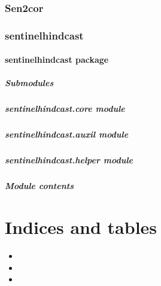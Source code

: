 \documentclass[letterpaper,10pt,english]{sphinxmanual}
\begin{document}
\subsection{Sen2cor}
\label{\detokenize{sen2cor:sen2cor}}\label{\detokenize{sen2cor::doc}}

\subsection{sentinel\sphinxhyphen{}hindcast}
\label{\detokenize{modules:sentinel-hindcast}}\label{\detokenize{modules::doc}}

\subsubsection{sentinelhindcast package}
\label{\detokenize{sentinelhindcast:sentinelhindcast-package}}\label{\detokenize{sentinelhindcast::doc}}

\paragraph{Submodules}
\label{\detokenize{sentinelhindcast:submodules}}

\paragraph{sentinelhindcast.core module}
\label{\detokenize{sentinelhindcast:sentinelhindcast-core-module}}

\paragraph{sentinelhindcast.auxil module}
\label{\detokenize{sentinelhindcast:sentinelhindcast-auxil-module}}

\paragraph{sentinelhindcast.helper module}
\label{\detokenize{sentinelhindcast:sentinelhindcast-helper-module}}

\paragraph{Module contents}
\label{\detokenize{sentinelhindcast:module-contents}}

\chapter{Indices and tables}
\label{\detokenize{index:indices-and-tables}}\begin{itemize}
\item {} 

\item {} 

\item {} 

\end{itemize}



\renewcommand{\indexname}{Index}
\printindex
\end{document}
